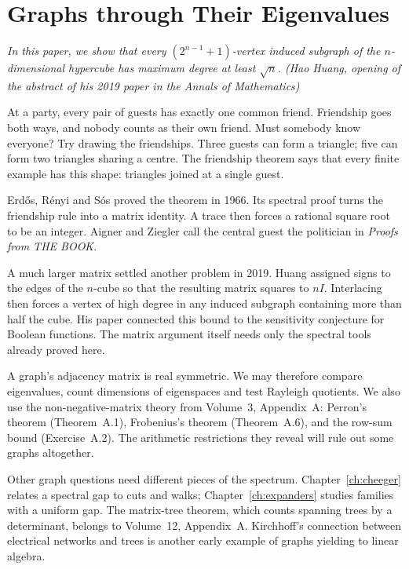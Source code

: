\chapter{Graphs through Their Eigenvalues}\label{linear:ch:graphs}

\begin{center}\itshape
In this paper, we show that every $(2^{n-1}+1)$-vertex induced subgraph of the $n$-dimensional hypercube has maximum degree at
least $\sqrt n$.
\upshape(Hao Huang, opening of the abstract of his 2019 paper in the \emph{Annals of Mathematics})
\end{center}

At a party, every pair of guests has exactly one common friend. Friendship goes both ways, and nobody counts as their own friend. Must somebody know everyone? Try drawing the friendships. Three guests can form a triangle; five can form two triangles sharing a centre. The friendship theorem says that every finite example has this shape: triangles joined at a single guest.

Erd\H{o}s, R\'enyi and S\'os proved the theorem in 1966. Its spectral proof turns the friendship rule into a matrix identity. A trace then forces a rational square root to be an integer. Aigner and Ziegler call the central guest the politician in \emph{Proofs from THE BOOK}.

A much larger matrix settled another problem in 2019. Huang assigned signs to the edges of the $n$-cube so that the resulting matrix squares to $nI$. Interlacing then forces a vertex of high degree in any induced subgraph containing more than half the cube. His paper connected this bound to the sensitivity conjecture for Boolean functions. The matrix argument itself needs only the spectral tools already proved here.

A graph's adjacency matrix is real symmetric. We may therefore compare eigenvalues, count dimensions of eigenspaces and test Rayleigh quotients. We also use the non-negative-matrix theory from Volume~3, Appendix~A: Perron's theorem (Theorem~A.1), Frobenius's theorem (Theorem~A.6), and the row-sum bound (Exercise~A.2). The arithmetic restrictions they reveal will rule out some graphs altogether.


Other graph questions need different pieces of the spectrum. Chapter~\ref{ch:cheeger} relates a spectral gap to cuts and walks; Chapter~\ref{ch:expanders} studies families with a uniform gap. The matrix-tree theorem, which counts spanning trees by a determinant, belongs to Volume~12, Appendix~A. Kirchhoff's connection between electrical networks and trees is another early example of graphs yielding to linear algebra.

